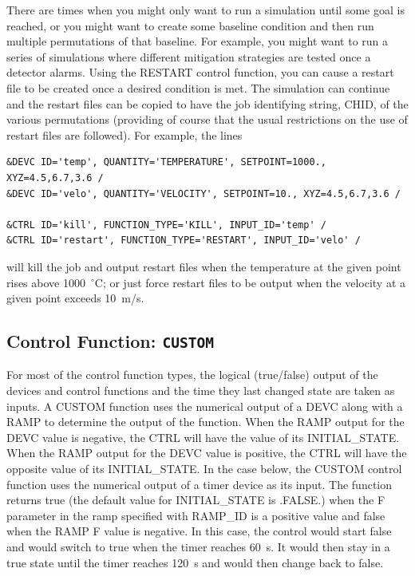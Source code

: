 \documentclass[11pt]{book}
\begin{document}
There are times when you might only want to run a simulation until some goal is reached, or you might want to create some baseline condition and then run multiple permutations of that baseline. For example, you might want to run a series of simulations where different mitigation strategies are tested once a detector alarms. Using the {\ct RESTART} control function, you can cause a restart file to be created once a desired condition is met.  The simulation can continue and the restart files can be copied to have the job identifying string, {\ct CHID}, of the various permutations (providing of course that the usual restrictions on the use of restart files are followed). For example, the lines
\begin{lstlisting}
&DEVC ID='temp', QUANTITY='TEMPERATURE', SETPOINT=1000., XYZ=4.5,6.7,3.6 /
&DEVC ID='velo', QUANTITY='VELOCITY', SETPOINT=10., XYZ=4.5,6.7,3.6 /

&CTRL ID='kill', FUNCTION_TYPE='KILL', INPUT_ID='temp' /
&CTRL ID='restart', FUNCTION_TYPE='RESTART', INPUT_ID='velo' /
\end{lstlisting}
will kill the job and output restart files when the temperature at the given point rises above 1000~$^\circ$C; or just force restart files to be output when the velocity at a given point exceeds 10~m/s.



\subsection{Control Function: \texorpdfstring{{\tt CUSTOM}}{CUSTOM} }
\label{info:CUSTOM}

For most of the control function types, the logical (true/false) output of the devices and control functions and the time they last changed state are taken as inputs.  A {\ct CUSTOM} function uses the numerical output of a {\ct DEVC} along with a {\ct RAMP} to determine the output of the function.  When the {\ct RAMP} output for the {\ct DEVC} value is negative, the {\ct CTRL} will have the value of its {\ct INITIAL\_STATE}.  When the {\ct RAMP} output for the {\ct DEVC} value is positive, the {\ct CTRL} will have the opposite value of its {\ct INITIAL\_STATE}. In the case below, the {\ct CUSTOM} control function uses the numerical output of a timer device as its input.  The function returns true (the default value for {\ct INITIAL\_STATE} is {\ct .FALSE.}) when the {\ct F} parameter in the ramp specified with {\ct RAMP\_ID} is a positive value and false when the {\ct RAMP} {\ct F} value is negative. In this case, the control would start false and would switch to true when the timer reaches 60~s.  It would then stay in a true state until the timer reaches 120~s and would then change back to false.
\end{document}
